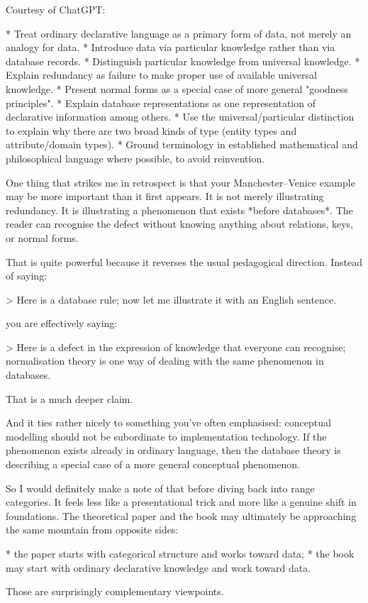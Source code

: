 


\begin{worktt}
Courtesy of ChatGPT:

* Treat ordinary declarative language as a primary form of data, not merely an analogy for data.
* Introduce data via particular knowledge rather than via database records.
* Distinguish particular knowledge from universal knowledge.
* Explain redundancy as failure to make proper use of available universal knowledge.
* Present normal forms as a special case of more general "goodness principles".
* Explain database representations as one representation of declarative information among others.
* Use the universal/particular distinction to explain why there are two broad kinds of type (entity types and attribute/domain types).
* Ground terminology in established mathematical and philosophical language where possible, to avoid reinvention.

One thing that strikes me in retrospect is that your Manchester–Venice example may be more important than it first appears. It is not merely illustrating redundancy. It is illustrating a phenomenon that exists *before databases*. The reader can recognise the defect without knowing anything about relations, keys, or normal forms.

That is quite powerful because it reverses the usual pedagogical direction. Instead of saying:

> Here is a database rule; now let me illustrate it with an English sentence.

you are effectively saying:

> Here is a defect in the expression of knowledge that everyone can recognise; normalisation theory is one way of dealing with the same phenomenon in databases.

That is a much deeper claim.

And it ties rather nicely to something you've often emphasised: conceptual modelling should not be subordinate to implementation technology. If the phenomenon exists already in ordinary language, then the database theory is describing a special case of a more general conceptual phenomenon.

So I would definitely make a note of that before diving back into range categories. It feels less like a presentational trick and more like a genuine shift in foundations. The theoretical paper and the book may ultimately be approaching the same mountain from opposite sides:

* the paper starts with categorical structure and works toward data;
* the book may start with ordinary declarative knowledge and work toward data.

Those are surprisingly complementary viewpoints.

\end{worktt}

